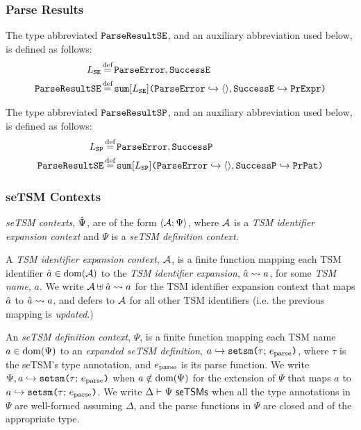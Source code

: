\subsubsection{Parse Results}
 The type abbreviated $\mathtt{ParseResultSE}$, and an auxiliary abbreviation used below, is defined as follows:
\begin{align*}
L_\mathtt{SE} & \defeq \lbltxt{ParseError}, \lbltxt{SuccessE}\\
\tParseResultExp & \defeq \asum{L_\mathtt{SE}}{
  \mapitem{\lbltxt{ParseError}}{\prodt{}}, 
  \mapitem{\lbltxt{SuccessE}}{\tCEExp}
}\\
\end{align*} %

\begin{grayparbox}
 The type abbreviated $\mathtt{ParseResultSP}$, and an auxiliary abbreviation used below, is defined as follows:
\begin{align*}
L_\mathtt{SP} & \defeq \lbltxt{ParseError}, \lbltxt{SuccessP}\\
\tParseResultExp & \defeq \asum{L_\mathtt{SP}}{
  \mapitem{\lbltxt{ParseError}}{\prodt{}}, 
  \mapitem{\lbltxt{SuccessP}}{\tCEPat}
}\\
\end{align*} %
\end{grayparbox}

\subsubsection{seTSM Contexts}

\emph{seTSM contexts}, $\hat{\Psi}$, are of the form $\langle \mathcal{A}; \Psi \rangle$, where $\mathcal{A}$ is a \emph{TSM identifier expansion context} and $\Psi$ is a \emph{seTSM definition context}. 

A \emph{TSM identifier expansion context}, $\mathcal{A}$, is a finite function mapping each TSM identifier $\hat{a} \in \text{dom}(\mathcal{A})$ to the \emph{TSM identifier expansion}, $\hat{a} \leadsto a$, for some \emph{TSM name}, $a$. We write $\mathcal{A} \uplus \hat{a} \leadsto a$ for the TSM identifier expansion context that maps $\hat{a}$ to $\hat{a} \leadsto a$, and defers to $\mathcal{A}$ for all other TSM identifiers (i.e. the previous mapping is \emph{updated}.)

An \emph{seTSM definition context}, $\Psi$, is a finite function mapping each TSM name $a \in \text{dom}(\Psi)$ to an \emph{expanded seTSM definition}, $a \hookrightarrow \texttt{setsm}\texttt{(}\tau;\,e_\text{parse}\texttt{)}$, where $\tau$ is the seTSM's type annotation, and $e_\text{parse}$ is its parse function. We write $\Psi, a \hookrightarrow \texttt{setsm}\texttt{(}\tau;\,e_\text{parse}\texttt{)}$ when $a \notin \text{dom}(\Psi)$ for the extension of $\Psi$ that maps $a$ to $a \hookrightarrow \texttt{setsm}\texttt{(}\tau;\,e_\text{parse}\texttt{)}$. We write $\Delta \vdash \Psi~\mathsf{seTSMs}$  when all the type annotations in $\Psi$ are well-formed assuming $\Delta$, and the parse functions in $\Psi$ are closed and of the appropriate type.

